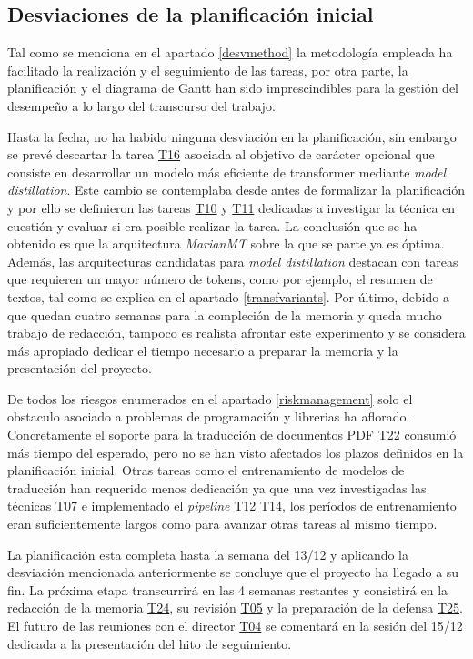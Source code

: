 \subsection{Desviaciones de la planificación inicial}\label{desviaplan}
Tal como se menciona en el apartado \ref{desvmethod} la metodología empleada ha facilitado la realización y el seguimiento de las tareas, por otra parte, la planificación y el diagrama de Gantt han sido imprescindibles para la gestión del desempeño a lo largo del transcurso del trabajo.

Hasta la fecha, no ha habido ninguna desviación en la planificación, sin embargo se prevé descartar la tarea \hyperref[T16]{T16} asociada al objetivo de carácter opcional que consiste en desarrollar un modelo más eficiente de transformer mediante \textit{model distillation}. Este cambio se contemplaba desde antes de formalizar la planificación y por ello se definieron las tareas \hyperref[T10]{T10} y \hyperref[T11]{T11} dedicadas a investigar la técnica en cuestión y evaluar si era posible realizar la tarea.
La conclusión que se ha obtenido es que la arquitectura \textit{MarianMT} sobre la que se parte ya es óptima. Además, las arquitecturas candidatas para \textit{model distillation} destacan con tareas que requieren un mayor número de tokens, como por ejemplo, el resumen de textos, tal como se explica en el apartado \ref{transfvariants}. Por último, debido a que quedan cuatro semanas para la compleción de la memoria y queda mucho trabajo de redacción, tampoco es realista afrontar este experimento y se considera más apropiado dedicar el tiempo necesario a preparar la memoria y la presentación del proyecto.

De todos los riesgos enumerados en el apartado \ref{riskmanagement} solo el obstaculo asociado a problemas de programación y librerias ha aflorado.
Concretamente el soporte para la traducción de documentos PDF \hyperref[T22]{T22} consumió más tiempo del esperado, pero no se han visto afectados los plazos definidos en la planificación inicial. Otras tareas como el entrenamiento de modelos de traducción han requerido menos dedicación ya que una vez investigadas las técnicas \hyperref[T07]{T07} e implementado el \textit{pipeline} \hyperref[T12]{T12} \hyperref[T14]{T14}, los períodos de entrenamiento eran suficientemente largos como para avanzar otras tareas al mismo tiempo.

La planificación esta completa hasta la semana del 13/12 y aplicando la desviación mencionada anteriormente se concluye que el proyecto ha llegado a su fin. La próxima etapa transcurrirá en las 4 semanas restantes y consistirá en la redacción de la memoria \hyperref[T24]{T24}, su revisión \hyperref[T05]{T05} y la preparación de la defensa \hyperref[T25]{T25}. El futuro de las reuniones con el director \hyperref[T04]{T04} se comentará en la sesión del 15/12 dedicada a la presentación del hito de seguimiento.